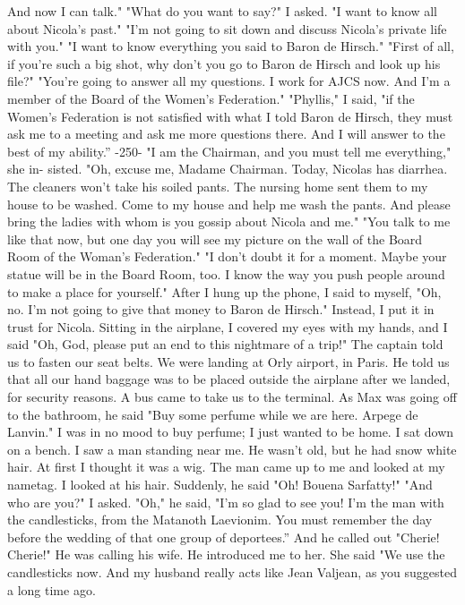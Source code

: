 And now I can talk."
"What do you want to say?"
I asked.
"I want to know all about Nicola's past."
"I'm not going to sit down and discuss Nicola's private life 
with you."
"I want to know everything you said to Baron de Hirsch."
"First of all, if you're such a big shot, why don't you go to 
Baron de Hirsch and look up his file?"
"You're going to answer all my questions.
I work for AJCS now.
And I'm a member of the Board of the Women's Federation."
"Phyllis," I said, "if the Women's Federation is not satisfied 
with what I told Baron de Hirsch, they must ask me to a meeting and 
ask me more questions there.
And I will answer to the best of my ability.”
-250- 
"I am the Chairman, and you must tell me everything," she in-
sisted.
"Oh, excuse me, Madame Chairman.
Today, Nicolas has diarrhea.
The 
cleaners won't take his soiled pants.
The nursing home sent them to 
my house to be washed.
Come to my house and help me wash the pants.
And please bring the ladies with whom is you gossip about Nicola and me."
"You talk to me like that now, but one day you will see my picture 
on the wall of the Board Room of the Woman's Federation."
"I don't doubt it for a moment.
Maybe your statue will be in the 
Board Room, too.
I know the way you push people around to make a place 
for yourself."
After I hung up the phone, I said to myself, "Oh, no.
I'm not going to give that money to Baron de Hirsch."
Instead, I put 
it in trust for Nicola.
Sitting in the airplane, I covered my eyes with my hands, and I 
said "Oh, God, please put an end to this nightmare of a trip!"
The 
captain told us to fasten our seat belts.
We were landing at Orly 
airport, in Paris.
He told us that all our hand baggage was to be 
placed outside the airplane after we landed, for security reasons.
A 
bus came to take us to the terminal.
As Max was going off to the bathroom, he said "Buy some perfume while we are here.
Arpege de Lanvin."
I was in no mood to buy perfume; I just wanted to be home.
I sat down on a bench.
I saw a man standing near me.
He wasn't 
old, but he had snow white hair.
At first I thought it was a wig.
The man came up to me and looked at my nametag.
I looked at his hair.
Suddenly, he said "Oh!
Bouena Sarfatty!"
"And who are you?"
I asked.
"Oh," he said, "I'm so glad to see you!
I'm the man with the 
candlesticks, from the Matanoth Laevionim.
You must remember the day before the wedding of that one group of deportees.” And he called out
"Cherie!
Cherie!"
He was calling his wife.
He introduced me to her.
She said "We use the candlesticks now.
And my husband really 
acts like Jean Valjean, as you suggested a long time ago.
